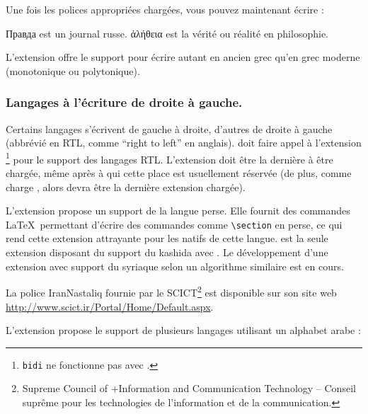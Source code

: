 Une fois les polices appropriées chargées, vous pouvez maintenant écrire :

\begin{example}
\textrussian{Правда} est
un journal russe.
\textgreek{ἀλήθεια} est la vérité
ou réalité en philosophie.
\end{example}

L'extension \cite{xgreek} offre le support
pour écrire autant en ancien grec qu'en grec moderne (monotonique ou
polytonique).

\subsubsection{Langages à l'écriture de droite à gauche.}

Certains langages s'écrivent de gauche à droite, d'autres de droite à
gauche (abbrévié en RTL, comme \enquote{right to left} en
anglais).  doit faire appel à l'extension
\cite{bidi}\footnote{\texttt{bidi} ne fonctionne pas avec
  .} pour le support des langages RTL. L'extension
 doit être la dernière à être chargée, même après
 à qui cette place est usuellement réservée (de plus,
comme  charge , alors 
devra être la dernière extension chargée).

L'extension \cite{xepersian} propose un
support de la langue perse. Elle fournit des commandes \LaTeX\
permettant d'écrire des commandes comme \verb|\section| en perse,
ce qui rend cette extension attrayante pour les natifs de cette
langue.  est la seule extension disposant du support du
kashida\index{kashida} avec \hologo{XeLaTeX}. Le développement d'une
extension avec support du syriaque selon un algorithme similaire est
en cours.

La police IranNastaliq fournie par le SCICT\footnote{Supreme Council of
+Information and Communication Technology -- Conseil suprême pour les
technologies de l'information et de la communication. \NdT} est
disponible sur son site web
\url{http://www.scict.ir/Portal/Home/Default.aspx}.

L'extension \cite{arabxetex} propose le support de
plusieurs langages utilisant un alphabet arabe :


